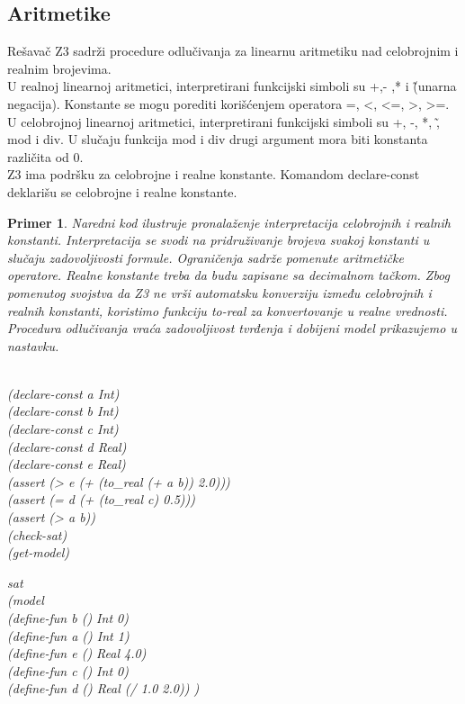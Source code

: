 \documentclass[12pt,oneside]{memoir}
\newtheorem{primer}{Primer}
\begin{document}
\subsection{Aritmetike}
Rešavač Z3 sadrži procedure odlučivanja za linearnu aritmetiku nad celobrojnim i realnim brojevima.
\\
U realnoj linearnoj aritmetici, interpretirani funkcijski simboli su +,- ,* i \~ (unarna negacija). Konstante se mogu porediti korišćenjem operatora =, <, <=, >, >=. U celobrojnoj linearnoj aritmetici, interpretirani funkcijski simboli su +, -, *, \~, mod i div. U slučaju funkcija mod i div drugi argument mora biti konstanta različita od 0.  
\\
Z3 ima podršku za celobrojne i realne konstante. Komandom declare-const deklarišu se celobrojne i realne konstante.


\begin{primer} Naredni kod ilustruje pronalaženje interpretacija celobrojnih i realnih konstanti. Interpretacija se svodi na pridruživanje brojeva svakoj konstanti u slučaju zadovoljivosti formule. Ograničenja sadrže pomenute aritmetičke operatore. Realne konstante treba da budu zapisane sa decimalnom tačkom. Zbog pomenutog svojstva da Z3 ne vrši automatsku konverziju između celobrojnih i realnih konstanti, koristimo funkciju to-real za konvertovanje u realne vrednosti. Procedura odlučivanja vraća zadovoljivost tvrđenja i dobijeni model prikazujemo u nastavku.   \\ \\
\hspace{-0.7cm}
\begin{minipage}[b]{0.4\textwidth}
(declare-const a Int)
\\(declare-const b Int)
\\(declare-const c Int)
\\(declare-const d Real)
\\(declare-const e Real)
\\(assert (> e (+ (to\_real (+ a b)) 2.0)))
\\(assert (= d (+ (to\_real c) 0.5)))
\\(assert (> a b))
\\(check-sat)
\\(get-model)
\end{minipage}
\hspace{3cm}
\begin{minipage}[t]{0.4\textwidth}
\vspace{-6.7cm}
sat \\(model
\\(define-fun b () Int 0) 
\\(define-fun a () Int 1) 
\\(define-fun e () Real 4.0) \\(define-fun c () Int 0) \\(define-fun d () Real (/ 1.0 2.0)) )
\end{minipage}


\end{primer}
\end{document}
